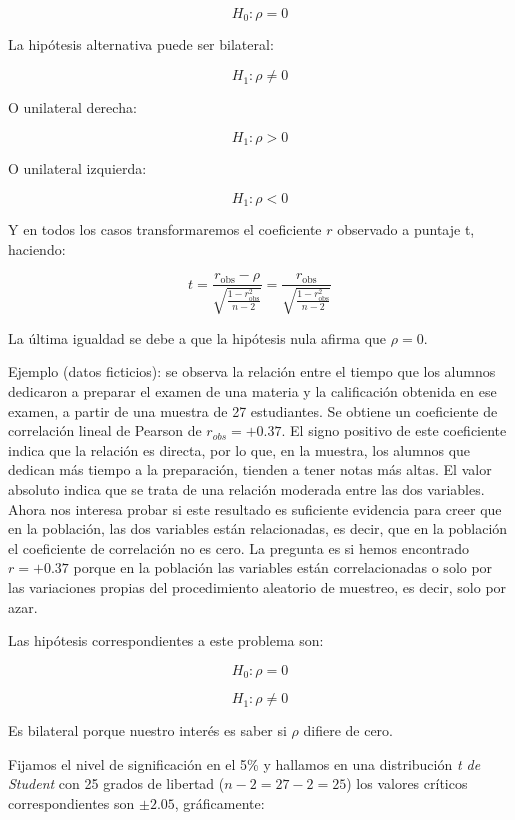 \documentclass[]{book}
\begin{document}
\[H_{0}:\rho = 0\]

La hipótesis alternativa puede ser bilateral:

\[H_{1}:\rho \neq 0\]

O unilateral derecha:

\[H_{1}:\rho > 0\]

O unilateral izquierda:

\[H_{1}:\rho < 0\]

Y en todos los casos transformaremos el coeficiente \(r\) observado a puntaje t, haciendo:

\[t = \frac{r_{\text{obs}} - \rho}{\sqrt{\frac{1 - r_{\text{obs}}^{2}}{n - 2}}} = \frac{r_{\text{obs}}}{\sqrt{\frac{1 - r_{\text{obs}}^{2}}{n - 2}}}\]

La última igualdad se debe a que la hipótesis nula afirma que \(\rho = 0\).

Ejemplo (datos ficticios): se observa la relación entre el tiempo que los alumnos dedicaron a preparar el examen de una materia y la calificación obtenida en ese examen, a partir de una muestra de 27 estudiantes. Se obtiene un coeficiente de correlación lineal de Pearson de \(r_{obs} = + 0.37\). El signo positivo de este coeficiente indica que la relación es directa, por lo que, en la muestra, los
alumnos que dedican más tiempo a la preparación, tienden a tener notas
más altas. El valor absoluto indica que se trata de una relación
moderada entre las dos variables. Ahora nos interesa probar si este
resultado es suficiente evidencia para creer que en la población, las
dos variables están relacionadas, es decir, que en la población el
coeficiente de correlación no es cero. La pregunta es si hemos
encontrado \(r=+0.37\) porque en la población las variables están
correlacionadas o solo por las variaciones propias del procedimiento
aleatorio de muestreo, es decir, solo por azar.

Las hipótesis correspondientes a este problema son:

\[H_{0}:\rho = 0\]

\[H_{1}:\rho \neq 0\]

Es bilateral porque nuestro interés es saber si \(\rho\) difiere de cero.

Fijamos el nivel de significación en el 5\% y hallamos en una
distribución \emph{t de Student} con 25 grados de libertad (\(n-2=27-2=25\))
los valores críticos correspondientes son \(±2.05\), gráficamente:
\end{document}
